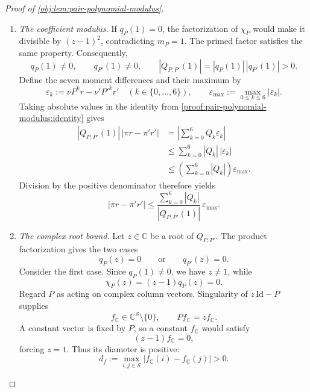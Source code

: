 \begin{proof}[Proof of \cref{obj:lem:pair-polynomial-modulus}]
\begin{enumerate}
Induction extends this implication to
\[
D_P^nw=0\quad\Longrightarrow\quad D_Pw=0
\qquad(n\in\mathbb N,\ w\in\mathbb R^{\mathcal S}).
\]
For \(n=0\), the premise gives \(w=0\).
For the induction step,
\[
D_P^{n+1}w=0
\quad\Longrightarrow\quad
D_P^n(D_Pw)=0
\quad\Longrightarrow\quad
D_P^2w=0
\quad\Longrightarrow\quad
D_Pw=0,
\]
where the middle implication uses the induction hypothesis.

Thus the generalized eigenspace at one is
\[
\mathcal E_{P,1}
:=\bigcup_{n\in\mathbb N}\ker(D_P^n)
=\ker D_P
=\operatorname{span}_{\mathbb R}\{\mathbf1\}.
\]
Algebraic multiplicity equals the dimension of this generalized eigenspace.
Since \(\mathbf1\ne0\), it follows that
\[
m_P
:=\max\{n\in\mathbb N:(z-1)^n\text{ divides }\chi_P(z)\}
=\dim_{\mathbb R}\mathcal E_{P,1}=1.
\]
The identical argument for \(P'\) gives
\[
m_{P'}
:=\max\{n\in\mathbb N:(z-1)^n\text{ divides }\chi_{P'}(z)\}
=1.
\]

\item \emph{The coefficient modulus.}\label{proof:pair-polynomial-modulus:coefficient-modulus}
If \(q_P(1)=0\), the factorization of \(\chi_P\) would make it divisible by
\((z-1)^2\), contradicting \(m_P=1\).
The primed factor satisfies the same property. Consequently,
\[
q_P(1)\ne0,\qquad q_{P'}(1)\ne0,\qquad
|Q_{P,P'}(1)|=|q_P(1)|\,|q_{P'}(1)|>0.
\]
Define the seven moment differences and their maximum by
\[
\varepsilon_k:=\nu P^kr-\nu'P'^kr'
\quad(k\in\{0,\ldots,6\}),\qquad
\varepsilon_{\max}:=\max_{0\le k\le6}|\varepsilon_k|.
\]
Taking absolute values in the identity from \cref{proof:pair-polynomial-modulus:identity} gives
\[
\begin{aligned}
|Q_{P,P'}(1)|\,|\pi r-\pi'r'|
&=\left|\sum_{k=0}^6Q_k\varepsilon_k\right|\\
&\le\sum_{k=0}^6|Q_k|\,|\varepsilon_k|\\
&\le\left(\sum_{k=0}^6|Q_k|\right)\varepsilon_{\max}.
\end{aligned}
\]
Division by the positive denominator therefore yields
\[
|\pi r-\pi'r'|
\le
\frac{\sum_{k=0}^6|Q_k|}{|Q_{P,P'}(1)|}\,
\varepsilon_{\max}.
\]

\item \emph{The complex root bound.}
Let \(z\in\mathbb C\) be a root of \(Q_{P,P'}\).
The product factorization gives the two cases
\[
q_P(z)=0\qquad\text{or}\qquad q_{P'}(z)=0.
\]
Consider the first case.
Since \(q_P(1)\ne0\), we have \(z\ne1\), while
\[
\chi_P(z)=(z-1)q_P(z)=0.
\]
Regard \(P\) as acting on complex column vectors.
Singularity of \(z\,\mathrm{Id}-P\) supplies
\[
f_{\mathbb C}\in\mathbb C^{\mathcal S}\setminus\{0\},
\qquad Pf_{\mathbb C}=zf_{\mathbb C}.
\]
A constant vector is fixed by \(P\), so a constant \(f_{\mathbb C}\) would satisfy
\[
(z-1)f_{\mathbb C}=0,
\]
forcing \(z=1\). Thus its diameter is positive:
\[
d_f:=\max_{i,j\in\mathcal S}
|f_{\mathbb C}(i)-f_{\mathbb C}(j)|>0.
\]


\end{enumerate}
\end{proof}
